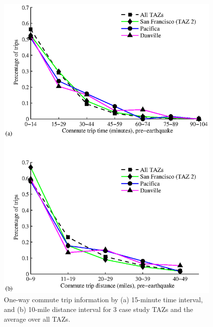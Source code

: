 \begin{figure}
\centering
\includegraphics[width=6in]{FIGS/equity_trip_time_distance_pdfs_by_taz_to_work_and_from_work.eps} 
\caption{One-way commute trip information by (a) 15-minute time interval, and (b) 10-mile distance interval for 3 case study TAZs and the average over all TAZs.}
\label{fig:time_distance_pdfs}
\end{figure}




